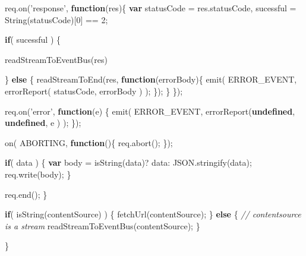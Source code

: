 \documentclass[]{article}
\newenvironment{Shaded}{}{}
\newcommand{\KeywordTok}[1]{\textcolor[rgb]{0.00,0.44,0.13}{\textbf{{#1}}}}
\newcommand{\DecValTok}[1]{\textcolor[rgb]{0.25,0.63,0.44}{{#1}}}
\newcommand{\StringTok}[1]{\textcolor[rgb]{0.25,0.44,0.63}{{#1}}}
\newcommand{\CommentTok}[1]{\textcolor[rgb]{0.38,0.63,0.69}{\textit{{#1}}}}
\newcommand{\OtherTok}[1]{\textcolor[rgb]{0.00,0.44,0.13}{{#1}}}
\newcommand{\FunctionTok}[1]{\textcolor[rgb]{0.02,0.16,0.49}{{#1}}}
\newcommand{\NormalTok}[1]{{#1}}
\begin{document}
\begin{Shaded}
\begin{Highlighting}[]
      \OtherTok{req}\NormalTok{.}\FunctionTok{on}\NormalTok{(}\StringTok{'response'}\NormalTok{, }\KeywordTok{function}\NormalTok{(res)\{}
         \KeywordTok{var} \NormalTok{statusCode = }\OtherTok{res}\NormalTok{.}\FunctionTok{statusCode}\NormalTok{,}
             \NormalTok{sucessful = }\FunctionTok{String}\NormalTok{(statusCode)[}\DecValTok{0}\NormalTok{] == }\DecValTok{2}\NormalTok{;}
                                
         \KeywordTok{if}\NormalTok{( sucessful ) \{          }
               
            \FunctionTok{readStreamToEventBus}\NormalTok{(res)}
            
         \NormalTok{\} }\KeywordTok{else} \NormalTok{\{}
            \FunctionTok{readStreamToEnd}\NormalTok{(res, }\KeywordTok{function}\NormalTok{(errorBody)\{}
               \FunctionTok{emit}\NormalTok{( }
                  \NormalTok{ERROR_EVENT, }
                  \FunctionTok{errorReport}\NormalTok{( statusCode, errorBody )}
               \NormalTok{);}
            \NormalTok{\});}
         \NormalTok{\}      }
      \NormalTok{\});}
      
      \OtherTok{req}\NormalTok{.}\FunctionTok{on}\NormalTok{(}\StringTok{'error'}\NormalTok{, }\KeywordTok{function}\NormalTok{(e) \{}
         \FunctionTok{emit}\NormalTok{( }
            \NormalTok{ERROR_EVENT, }
            \FunctionTok{errorReport}\NormalTok{(}\KeywordTok{undefined}\NormalTok{, }\KeywordTok{undefined}\NormalTok{, e )}
         \NormalTok{);}
      \NormalTok{\});}
      
      \FunctionTok{on}\NormalTok{( ABORTING, }\KeywordTok{function}\NormalTok{()\{              }
         \OtherTok{req}\NormalTok{.}\FunctionTok{abort}\NormalTok{();}
      \NormalTok{\});}
         
      \KeywordTok{if}\NormalTok{( data ) \{}
         \KeywordTok{var} \NormalTok{body = }\FunctionTok{isString}\NormalTok{(data)? data: }\OtherTok{JSON}\NormalTok{.}\FunctionTok{stringify}\NormalTok{(data);}
         \OtherTok{req}\NormalTok{.}\FunctionTok{write}\NormalTok{(body);}
      \NormalTok{\}}
      
      \OtherTok{req}\NormalTok{.}\FunctionTok{end}\NormalTok{();         }
   \NormalTok{\}}
   
   \KeywordTok{if}\NormalTok{( }\FunctionTok{isString}\NormalTok{(contentSource) ) \{}
      \FunctionTok{fetchUrl}\NormalTok{(contentSource);}
   \NormalTok{\} }\KeywordTok{else} \NormalTok{\{}
      \CommentTok{// contentsource is a stream}
      \FunctionTok{readStreamToEventBus}\NormalTok{(contentSource);   }
   \NormalTok{\}}

\NormalTok{\}}
\end{Highlighting}
\end{Shaded}
\end{document}
